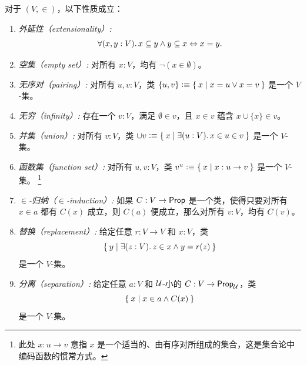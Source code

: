 \begin{thm}\label{thm:VisCST}
  对于 $(V, {\in})$，以下性质成立：
  \begin{enumerate}
  \item \emph{外延性（extensionality）:}
    \begin{equation*}
      \fall{x, y : V} x \subseteq y \land y \subseteq x \Leftrightarrow x = y.
    \end{equation*}
     \item \emph{空集（empty set）:} 对所有 $x:V$，均有 $\neg (x\in \emptyset)$。
    \item \emph{无序对（pairing）:} 对所有 $u, v:V$，类 $\{u, v\} \vcentcolon\equiv \Set{ x | x = u \vee x = v}$ 是一个 $V$-集。
    \item \emph{无穷（infinity）:} 存在一个 $v:V$，满足 $\emptyset\in v$，且 $x\in v$ 蕴含 $x\cup \{x\}\in v$。
  \item \emph{并集（union）:} 对所有 $v:V$，类 $\cup v\defeq \setof{ x | \exis{u:V} x \in u \in v}$ 是一个 $V$-集。
    \item \emph{函数集（function set）:} 对所有 $u, v:V$，类 $v^u \vcentcolon\equiv \Set{ x | x : u\to v}$ 是一个 $V$-集。%
      \footnote{此处 $x:u\to v$ 意指 $x$ 是一个适当的、由有序对所组成的集合，这是集合论中编码函数的惯常方式。}
   \item \emph{$\in$-归纳（$\in$-induction）:} 如果 $C : V \to \mathsf{Prop}$ 是一个类，使得只要对所有 $x\in a$ 都有 $C(x)$ 成立，则 $C(a)$ 便成立，那么对所有 $v:V$，均有 $C(v)$。
     \item \emph{替换（replacement）:} 给定任意 $r : V \to V$ 和 $x : V$，类
       \begin{equation*}
         \setof{ y | \exis{z : V} z \in x \land y = r(z)}
       \end{equation*}
       是一个 $V$-集。
   \item \emph{分离（separation）:} 给定任意 $a : V$ 和 $\mathcal{U}$-小的 $C : V \to \mathsf{Prop}_{\mathcal{U}}$，类
     \begin{equation*}
       \Set{ x | x \in a \land C(x)}
     \end{equation*}
     是一个 $V$-集。
  \end{enumerate}
\end{thm}


